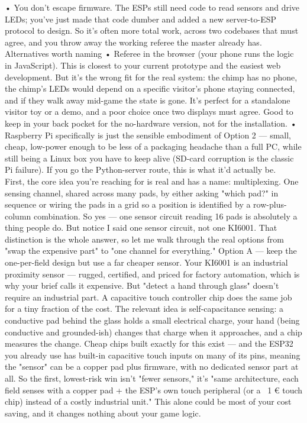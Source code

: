 •	You don't escape firmware. The ESPs still need code to read sensors and drive LEDs; you've just made that code dumber and added a new server-to-ESP protocol to design. So it's often more total work, across two codebases that must agree, and you throw away the working referee the master already has.
Alternatives worth naming
•	Referee in the browser (your phone runs the logic in JavaScript). This is closest to your current prototype and the easiest web development. But it's the wrong fit for the real system: the chimp has no phone, the chimp's LEDs would depend on a specific visitor's phone staying connected, and if they walk away mid-game the state is gone. It's perfect for a standalone visitor toy or a demo, and a poor choice once two displays must agree. Good to keep in your back pocket for the no-hardware version, not for the installation.
•	Raspberry Pi specifically is just the sensible embodiment of Option 2 — small, cheap, low-power enough to be less of a packaging headache than a full PC, while still being a Linux box you have to keep alive (SD-card corruption is the classic Pi failure). If you go the Python-server route, this is what it'd actually be.
 
 
First, the core idea you're reaching for is real and has a name: multiplexing. One sensing channel, shared across many pads, by either asking "which pad?" in sequence or wiring the pads in a grid so a position is identified by a row-plus-column combination. So yes — one sensor circuit reading 16 pads is absolutely a thing people do. But notice I said one sensor circuit, not one KI6001. That distinction is the whole answer, so let me walk through the real options from "swap the expensive part" to "one channel for everything."
Option A — keep the one-per-field design but use a far cheaper sensor. Your KI6001 is an industrial proximity sensor — rugged, certified, and priced for factory automation, which is why your brief calls it expensive. But "detect a hand through glass" doesn't require an industrial part. A capacitive touch controller chip does the same job for a tiny fraction of the cost. The relevant idea is self-capacitance sensing: a conductive pad behind the glass holds a small electrical charge, your hand (being conductive and grounded-ish) changes that charge when it approaches, and a chip measures the change. Cheap chips built exactly for this exist — and the ESP32 you already use has built-in capacitive touch inputs on many of its pins, meaning the "sensor" can be a copper pad plus firmware, with no dedicated sensor part at all. So the first, lowest-risk win isn't "fewer sensors," it's "same architecture, each field senses with a copper pad + the ESP's own touch peripheral (or a ~1 € touch chip) instead of a costly industrial unit." This alone could be most of your cost saving, and it changes nothing about your game logic.

